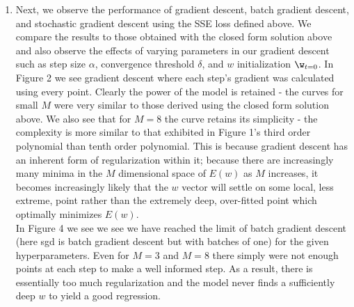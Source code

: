 \documentclass[1pt]{article}
\begin{document}
\begin{enumerate}[label=\alph*.)]
\item Next, we observe the performance of gradient descent, batch gradient descent, and stochastic gradient descent using the SSE loss defined above. We compare the results to those obtained with the closed form solution above and also observe the effects of varying parameters in our gradient descent such as step size $\alpha$, convergence threshold $\delta$, and $w$ initialization $\w_{t=0}$. In Figure 2 we see gradient descent where each step's gradient was calculated using every point. Clearly the power of the model is retained - the curves for small $M$ were very similar to those derived using the closed form solution above. We also see that for $M=8$ the curve retains its simplicity - the complexity is more similar to that exhibited in Figure 1's third order polynomial than tenth order polynomial. This is because gradient descent has an inherent form of regularization within it; because there are increasingly many minima in the $M$ dimensional space of $E(w)$ as $M$ increases, it becomes increasingly likely that the $w$ vector will settle on some local, less extreme, point rather than the extremely deep, over-fitted point which optimally minimizes $E(w)$.\\
In Figure 4 we see we see we have reached the limit of batch gradient descent (here sgd is batch gradient descent but with batches of one) for the given hyperparameters. Even for $M=3$ and $M=8$ there simply were not enough points at each step to make a well informed step. As a result, there is essentially too much regularization and the model never finds a sufficiently deep $w$ to yield a good regression.\\


\end{enumerate}
\end{document}
